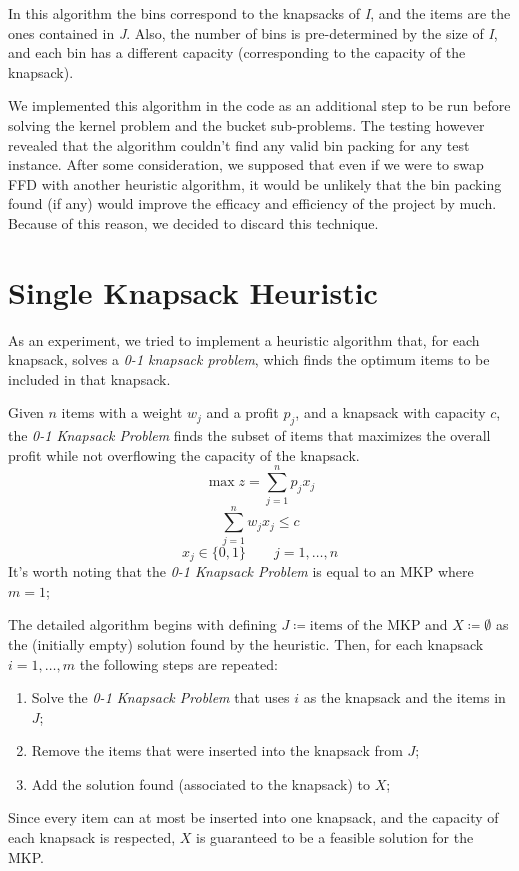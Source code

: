 In this algorithm the bins correspond to the knapsacks of \textit{I},
and the items are the ones contained in \textit{J}.
Also, the number of bins is pre-determined by the size of \textit{I},
and each bin has a different capacity (corresponding to the capacity of the knapsack).

We implemented this algorithm in the code as an additional step to be run
before solving the kernel problem and the bucket sub-problems.
The testing however revealed that the algorithm couldn't find any valid bin packing
for any test instance.
After some consideration, we supposed that even if we were to swap FFD with another
heuristic algorithm, it would be unlikely that the bin packing found (if any) would improve
the efficacy and efficiency of the project by much.
Because of this reason, we decided to discard this technique.


\section{Single Knapsack Heuristic}
As an experiment, we tried to implement a heuristic algorithm that,
for each knapsack, solves a \textit{0-1 knapsack problem},
which finds the optimum items to be included in that knapsack.

Given \(n\) items with a weight \(w_{j}\) and a profit \(p_{j}\),
and a knapsack with capacity \(c\), the \textit{0-1 Knapsack Problem} finds
the subset of items that maximizes the overall profit while not overflowing
the capacity of the knapsack.
\begin{equation}
    \max{z} = \sum_{j=1}^{n} p_{j} x_{j}
\end{equation}
\begin{equation}
    \sum_{j=1}^{n} w_{j} x_{j} \leq c
\end{equation}
\begin{equation}
    x_{j} \in \{0,1\} \qquad j=1,\dots,n
\end{equation}
It's worth noting that the \textit{0-1 Knapsack Problem} is equal to an MKP
where \(m=1\);

The detailed algorithm begins with defining \(J \coloneqq \text{items of the MKP}\)
and \(X \coloneqq \emptyset\) as the (initially empty) solution found by the heuristic.
Then, for each knapsack \(i = 1,\dots,m\) the following steps are repeated:
\begin{enumerate}
    \item Solve the \textit{0-1 Knapsack Problem} that uses \(i\) as the knapsack and the items in \(J\);
    \item Remove the items that were inserted into the knapsack from \(J\);
    \item Add the solution found (associated to the knapsack) to \(X\);
\end{enumerate}
Since every item can at most be inserted into one knapsack, and the capacity of each
knapsack is respected, \(X\) is guaranteed to be a feasible solution for the MKP\@.

